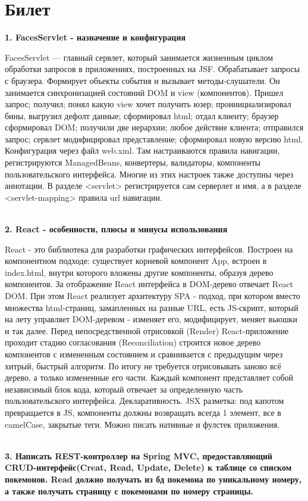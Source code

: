 \documentclass{article}
\newcommand{\bil}[5]{%
        \section{Билет}
        \textbf{1. #1}

        #4
        \\
        \textbf{2. #2}
        
        #5
        \\
        \textbf{3. #3}
}
\begin{document}
\bil{FacesServlet - назначение и конфигурация}
{React - особенности, плюсы и минусы использования}
{Написать REST-контроллер на Spring MVC, предоставляющий  CRUD-интерфейс(Creat, Read, Update, Delete) к таблице со списком покемонов. Read должно получать из бд покемона по уникальному номеру, а также получать страницу с покемонами по номеру страницы.}{
    FacesServlet — главный сервлет, который занимается жизненным циклом обработки запросов в приложениях, построенных на JSF. Обрабатывает запросы с браузера. 
    Формирует объекты события и вызывает методы-слушатели. 
    Он занимается синхронизацией состояний DOM и view (компонентов). Пришел запрос; получил; понял какую view хочет получить юзер; проинициализировал бины, выгрузил дефолт данные; сформировал html; отдал клиенту; браузер сформировал DOM; получили две иерархии; любое действие клиента; отправился запрос; сервлет модифицировал представление; сформировал новую версию html.
    Конфигурация через файл web.xml. 
    Там настраиваются правила навигации, регистрируются ManagedBeans, конвертеры, валидаторы, компоненты пользовательского интерфейса. 
    Многие из этих настроек также доступны через аннотации. 
    В разделе <servlet> регистрируется сам серверлет и имя, а в разделе <servlet-mapping> правила url навигации.
}{
    React - это библиотека для разработки графических интерфейсов. 
    Построен на компонентном подходе: существует корневой компонент App, встроен в index.html, внутри которого вложены другие компоненты, образуя дерево компонентов. 
    За отображение React интерфейса в DOM-дерево отвечает React DOM. 
    При этом React реализует архитектуру SPA - подход, при котором вместо множества html-страниц, замапленных на разные URL, есть JS-скрипт, который на лету управляет DOM-деревом - изменяет его, модифицирует, меняет вьюшки и так далее. 
    Перед непосредственной отрисовкой (Render) React-приложение проходит стадию согласования (Reconciliation) строится новое дерево компонентов с измененным состоянием и сравнивается с предыдущим через хитрый, быстрый алгоритм. 
    По итогу не требуется отрисовывать заново всё дерево, а только измененные его части.
    Каждый компонент представляет собой независимый блок кода, который отвечает за определенную часть пользовательского интерфейса.
    Декларативность.
    JSX разметка: под капотом превращается в JS, компоненты должны возвращать всегда 1 элемент, все в camelCase, закрытые теги.
    Можно писать нативные и фулстек приложения.
}
\end{document}
